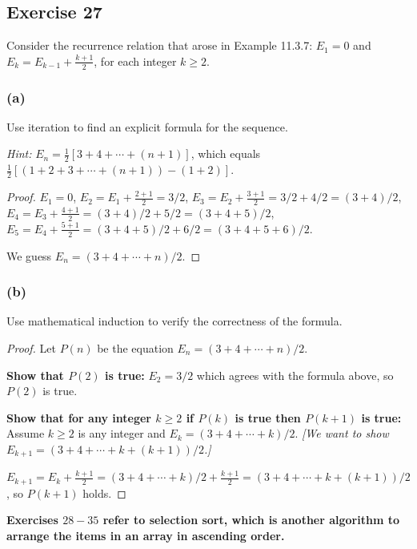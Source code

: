 \documentclass[14pt]{extarticle}
\newcommand{\cy}{\color{cyan}}
\begin{document}
\subsection{Exercise 27}
Consider the recurrence relation that arose in Example 11.3.7: \(E_1 = 0\) and \(E_k = E_{k-1} + \frac{k+1}{2}\), for each 
integer \(k \geq 2\).

\subsubsection{(a)}
Use iteration to find an explicit formula for the sequence.

{\it Hint:} \(E_n = \frac{1}{2}[3 + 4 + \cdots + (n + 1)]\), which equals \(\frac{1}{2}[(1 + 2 + 3 + \cdots + (n + 1)) - 
(1 + 2)]\).

\begin{proof}
\(E_1 = 0\), \(E_2 = E_1 + \frac{2+1}{2} = 3/2\), \(E_3 = E_2 + \frac{3+1}{2} = 3/2+4/2 = (3+4)/2\), \\
\(E_4 = E_3 + \frac{4+1}{2} = (3+4)/2 + 5/2 = (3+4+5)/2\), \\
\(E_5 = E_4 + \frac{5+1}{2} = (3+4+5)/2 + 6/2 = (3+4+5+6)/2\).

We guess \(E_n = (3+4+\cdots+n)/2\).
\end{proof}

\subsubsection{(b)}
Use mathematical induction to verify the correctness of the formula.

\begin{proof}
Let \(P(n)\) be the equation \(E_n = (3+4+\cdots+n)/2\).

{\bf Show that \(P(2)\) is true:} \(E_2 = 3/2\) which agrees with the formula above, so \(P(2)\) is true.

{\bf Show that for any integer \(k \geq 2\) if \(P(k)\) is true then \(P(k+1)\) is true:} Assume \(k \geq 2\) is any 
integer and \(E_k = (3+4+\cdots+k)/2\). {\it [We want to show \(E_{k+1} = (3+4+\cdots+k+(k+1))/2\).]}

\(E_{k+1} = E_k + \frac{k+1}{2} = (3+4+\cdots+k)/2 + \frac{k+1}{2} = (3+4+\cdots+k+(k+1))/2\), so \(P(k+1)\) holds.
\end{proof}

{\bf \cy Exercises \(28-35\) refer to selection sort, which is another algorithm to arrange the items in an array in 
ascending order.}
\end{document}
